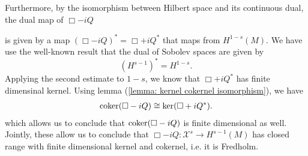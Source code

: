 \documentclass[12pt]{article}
\begin{document}
    Furthermore, by the isomorphism between Hilbert space and its continuous dual, the dual map of $\Box - iQ$
    \begin{center}
    \end{center}
    is given by a map $(\Box - iQ)^* = \Box + iQ^* $ that maps from $H^{1 - s}(M)$. We have use the well-known result that the dual of Sobolev spaces are given by $$(H^{s - 1})^* = H^{1 - s}.$$ Applying the second estimate to $1 - s$, we know that $\Box +iQ^*$ has finite dimensinal kernel. Using lemma (\ref{lemma: kernel cokernel isomorphism}), we have 
    \begin{align*}
    {\mathrm{coker}} (\Box - iQ) \cong {\mathrm{ker}}(\Box + iQ^*). 
    \end{align*}
    which allows us to conclude that ${\mathrm{coker}}(\Box - iQ)$ is finite dimensional as well. Jointly, these allow us to conclude that $\Box - iQ : \mathcal{X}^s \to H^{s - 1}(M)$ has closed range with finite dimensional kernel and cokernel, i.e. it is Fredholm. \\
    
    
\end{document}
